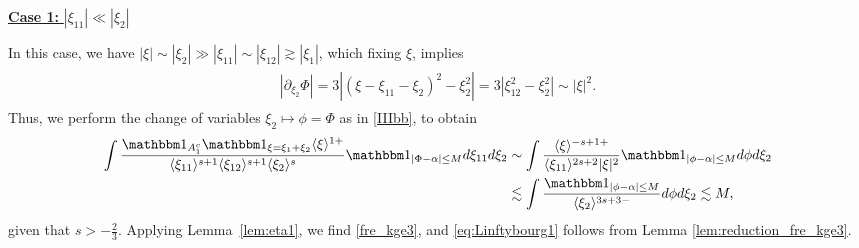 \documentclass[%
11pt,  reqno]{amsart}
\newcommand{\5}{\textup{V}}
\newcommand{\noi}{\noindent}
\newcommand{\ind}{\mathbbm 1}
\newcommand{\les}{\lesssim}
\theoremstyle{remark}
\newcommand{\bul}{\bullet}
\newcommand{\TT}{\mathcal{T}}
\newcommand{\al}{\alpha}
\newcommand{\bfrak}{\mathfrak{b}}
\newcommand{\gfrak}{\mathfrak{g}}
\newcommand{\pb}{\mathbf{p}}
\newcommand{\sbf}{\mathbf{s}}
\newcommand{\ges}{\gtrsim}
\newcommand{\jb}[1]
{\langle #1 \rangle}
\DeclareMathOperator{\mul}{mul}
\numberwithin{equation}{section}
\numberwithin{theorem}{section}
\begin{document}


\smallskip
\noi
\underline{\textbf{Case 1:} $|\xi_{11}| \ll |\xi_2|$}

In this case, we have $|\xi| \sim |\xi_2| \gg  |\xi_{11}| \sim |\xi_{12}| \ges |\xi_1|$, which fixing $\xi$, implies
\begin{align}\label{IIIb}
\begin{split}
| 
\partial_{\xi_{2}} \Phi|
= 3 | (\xi-\xi_{11}-\xi_2)^2 - \xi_2^2|
=3|\xi_{12}^2 - \xi_2^2|
\sim |\xi|^2. 
\end{split}
\end{align}
Thus, we perform the change of variables $\xi_2 \mapsto \phi = \Phi$ as in \eqref{IIIbb}, to obtain
\begin{align}
\int \frac{ \ind_{A_1^c} \ind_{\xi=\xi_1+\xi_2} \jb{\xi}^{1 + }  }{ \jb{\xi_{11}}^{s+1  } \jb{\xi_{12}}^{s+1} \jb{\xi_{2}}^s }
\ind_{|\Phi - \al| \le M}
d\xi_{11} d\xi_2
&
\sim \int \frac{ \jb{\xi}^{  - s +  1 + } }{ \jb{\xi_{11}}^{2s+2} |\xi|^2  } \ind_{|\phi - \al|\le M } d\phi d\xi_2 
\\
&
\les \int \frac{\ind_{|\phi - \al|\le M }}{ \jb{\xi_2}^{3s+3 - } } d\phi d\xi_2 \les M, 
\end{align}
given that $s>-\frac23$. Applying Lemma~\ref{lem:eta1}, we find \eqref{fre_kge3}, and \eqref{eq:Linftybourg1} follows from Lemma \ref{lem:reduction_fre_kge3}.
\end{document}
